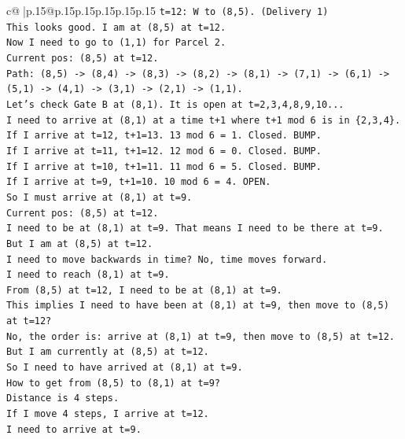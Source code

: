 \documentclass{article}
\begin{document}
{\begin{supertabular}{c@{$\;$}|p{.15\linewidth}@{}p{.15\linewidth}p{.15\linewidth}p{.15\linewidth}p{.15\linewidth}p{.15\linewidth}}
{{{\texttt{t=12: W to (8,5). (Delivery 1)} \\
\texttt{This looks good. I am at (8,5) at t=12.} \\
\texttt{Now I need to go to (1,1) for Parcel 2.} \\
\texttt{Current pos: (8,5) at t=12.} \\
\texttt{Path: (8,5) {-}> (8,4) {-}> (8,3) {-}> (8,2) {-}> (8,1) {-}> (7,1) {-}> (6,1) {-}> (5,1) {-}> (4,1) {-}> (3,1) {-}> (2,1) {-}> (1,1).} \\
\texttt{Let's check Gate B at (8,1). It is open at t=2,3,4,8,9,10...} \\
\texttt{I need to arrive at (8,1) at a time t+1 where t+1 mod 6 is in \{2,3,4\}.} \\
\texttt{If I arrive at t=12, t+1=13. 13 mod 6 = 1. Closed. BUMP.} \\
\texttt{If I arrive at t=11, t+1=12. 12 mod 6 = 0. Closed. BUMP.} \\
\texttt{If I arrive at t=10, t+1=11. 11 mod 6 = 5. Closed. BUMP.} \\
\texttt{If I arrive at t=9, t+1=10. 10 mod 6 = 4. OPEN.} \\
\texttt{So I must arrive at (8,1) at t=9.} \\
\texttt{Current pos: (8,5) at t=12.} \\
\texttt{I need to be at (8,1) at t=9. That means I need to be there at t=9.} \\
\texttt{But I am at (8,5) at t=12.} \\
\texttt{I need to move backwards in time? No, time moves forward.} \\
\texttt{I need to reach (8,1) at t=9.} \\
\texttt{From (8,5) at t=12, I need to be at (8,1) at t=9.} \\
\texttt{This implies I need to have been at (8,1) at t=9, then move to (8,5) at t=12?} \\
\texttt{No, the order is: arrive at (8,1) at t=9, then move to (8,5) at t=12.} \\
\texttt{But I am currently at (8,5) at t=12.} \\
\texttt{So I need to have arrived at (8,1) at t=9.} \\
\texttt{How to get from (8,5) to (8,1) at t=9?} \\
\texttt{Distance is 4 steps.} \\
\texttt{If I move 4 steps, I arrive at t=12.} \\
\texttt{I need to arrive at t=9.} \\
}}}
\end{supertabular}}
\end{document}
